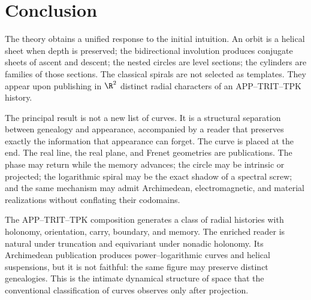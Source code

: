 \section{Conclusion}

The theory obtains a unified response to the initial intuition. An
orbit is a helical sheet when depth is preserved; the
bidirectional involution produces conjugate sheets of ascent and descent; the
nested circles are level sections; the cylinders are families of those
sections. The classical spirals are not selected as templates. They appear upon
publishing in \(\R^2\) distinct radial characters of an
APP--TRIT--TPK history.

The principal result is not a new list of curves. It is a structural
separation between genealogy and appearance, accompanied by a reader that
preserves exactly the information that appearance can forget. The curve is
placed at the end. The real line, the real plane, and Frenet geometries
are publications. The phase may return while the memory advances;
the circle may be intrinsic or projected; the logarithmic spiral
may be the exact shadow of a spectral screw; and the same mechanism
may admit Archimedean, electromagnetic, and material realizations without
conflating their codomains.

\begin{resultbox}[title={Functorial classification of the radial reader and stratification of its realizations}]
The APP--TRIT--TPK composition generates a class of radial histories with
holonomy, orientation, carry, boundary, and memory. The enriched reader is
natural under truncation and equivariant under nonadic holonomy. Its
Archimedean publication produces power--logarithmic curves and helical
suspensions, but it is not faithful: the same figure may preserve distinct
genealogies. This is the intimate dynamical structure of space that the
conventional classification of curves observes only after projection.
\end{resultbox}
